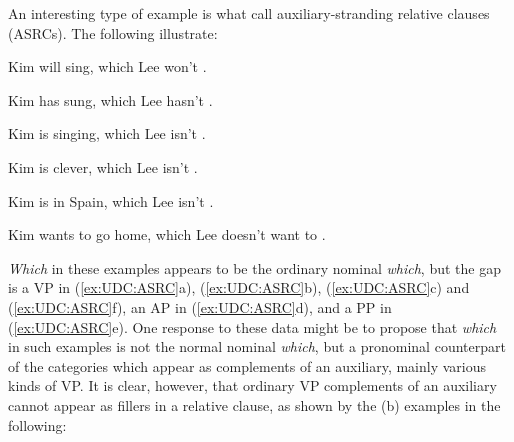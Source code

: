 \documentclass[output=paper
                ,modfonts
                ,nonflat
	        ,collection
	        ,collectionchapter
	        ,collectiontoclongg
 	        ,biblatex
                ,babelshorthands
                ,newtxmath
                ,draftmode
                ,colorlinks, citecolor=brown
]{./langsci/langscibook}
\begin{document}
{An interesting type of example is what \citet{Arnold:Borsley:10} call
auxiliary-stranding relative clauses (ASRCs). The following
illustrate:

\begin{exe}
  \ex \label{ex:UDC:ASRC}
  \begin{xlist}
    \ex Kim will sing, which Lee won't \trace{}.
    
    \ex Kim has sung, which Lee hasn't \trace{}.
    
    \ex Kim is singing, which Lee isn't \trace{}.
    
    \ex Kim is clever, which Lee isn't \trace{}.
    
    \ex Kim is in Spain, which Lee isn't \trace{}.
    
    \ex Kim wants to go home, which Lee doesn't want to \trace{}.
  \end{xlist}
\end{exe}

\noindent
\emph{Which} in these examples appears to be the ordinary nominal
\emph{which}, but the gap is a VP in (\ref{ex:UDC:ASRC}a), (\ref{ex:UDC:ASRC}b), (\ref{ex:UDC:ASRC}c) and (\ref{ex:UDC:ASRC}f), an AP in
(\ref{ex:UDC:ASRC}d), and a PP in (\ref{ex:UDC:ASRC}e). One response to these data might be to propose
that \emph{which} in such examples is not the normal nominal
\emph{which}, but a pronominal counterpart of the categories which appear
as complements of an auxiliary, mainly various kinds of VP. It is clear,
however, that ordinary VP complements of an auxiliary cannot appear as
fillers in a relative clause, as shown by the (b) examples in the
following:

\begin{exe} \ex \begin{xlist} 

\end{xlist}
\end{exe}

\begin{exe} \ex \begin{xlist} 

\end{xlist}
\end{exe}
\noindent
\begin{exe} \ex \begin{xlist} 


\end{xlist}
\end{exe}}
\end{document}
